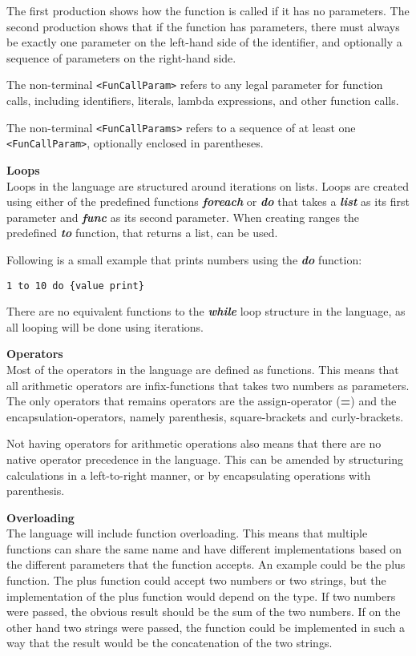 The first production shows how the function is called if it has no parameters.
The second production shows that if the function has parameters, there must always be exactly one parameter on the left-hand side of the identifier, and optionally a sequence of parameters on the right-hand side.

The non-terminal \texttt{<FunCallParam>} refers to any legal parameter for function calls, including identifiers, literals, lambda expressions, and other function calls.

The non-terminal \texttt{<FunCallParams>} refers to a sequence of at least one \texttt{<FunCallParam>}, optionally enclosed in parentheses.

\textbf{Loops}\\
Loops in the language are structured around iterations on lists.
Loops are created using either of the predefined functions \textbf{\textit{foreach}} or \textbf{\textit{do}} that takes a \textbf{\textit{list}} as its first parameter and \textbf{\textit{func}} as its second parameter.
When creating ranges the predefined \textbf{\textit{to}} function, that returns a list, can be used. 

Following is a small example that prints numbers using the \textbf{\textit{do}} function:
\begin{lstlisting}
1 to 10 do {value print}
\end{lstlisting}
There are no equivalent functions to the \textbf{\textit{while}} loop structure in the language, as all looping will be done using iterations.

\textbf{Operators}\\
Most of the operators in the language are defined as functions.
This means that all arithmetic operators are infix-functions that takes two numbers as parameters. 
The only operators that remains operators are the assign-operator (\textbf{=}) and the encapsulation-operators, namely parenthesis, square-brackets and curly-brackets.

Not having operators for arithmetic operations also means that there are no native operator precedence in the language.
This can be amended by structuring calculations in a left-to-right manner, or by encapsulating operations with parenthesis. 

\textbf{Overloading}\\

The language will include function overloading. 
This means that multiple functions can share the same name and have different implementations based on the different parameters that the function accepts. 
An example could be the plus function. 
The plus function could accept two numbers or two strings, but the implementation of the plus function would depend on the type.
If two numbers were passed, the obvious result should be the sum of the two numbers.
If on the other hand two strings were passed, the function could be implemented in such a way that the result would be the concatenation of the two strings.

